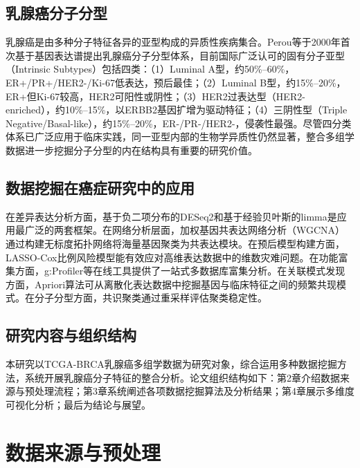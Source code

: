 \documentclass[12pt,a4paper]{ctexart}
\begin{document}
\subsection{乳腺癌分子分型}

乳腺癌是由多种分子特征各异的亚型构成的异质性疾病集合。Perou等\cite{perou2000molecular}于2000年首次基于基因表达谱提出乳腺癌分子分型体系，目前国际广泛认可的固有分子亚型（Intrinsic Subtypes）包括四类：（1）Luminal A型，约50\%--60\%，ER+/PR+/HER2-/Ki-67低表达，预后最佳；（2）Luminal B型，约15\%--20\%，ER+但Ki-67较高，HER2可阳性或阴性；（3）HER2过表达型（HER2-enriched），约10\%--15\%，以ERBB2基因扩增为驱动特征；（4）三阴性型（Triple Negative/Basal-like），约15\%--20\%，ER-/PR-/HER2-，侵袭性最强。尽管四分类体系已广泛应用于临床实践，同一亚型内部的生物学异质性仍然显著，整合多组学数据进一步挖掘分子分型的内在结构具有重要的研究价值。

\subsection{数据挖掘在癌症研究中的应用}

在差异表达分析方面，基于负二项分布的DESeq2\cite{love2014moderated}和基于经验贝叶斯的limma是应用最广泛的两套框架。在网络分析层面，加权基因共表达网络分析（WGCNA）\cite{langfelder2008wgcna}通过构建无标度拓扑网络将海量基因聚类为共表达模块。在预后模型构建方面，LASSO-Cox比例风险模型\cite{simon2011regularization}能有效应对高维表达数据中的维数灾难问题。在功能富集方面，g:Profiler\cite{kolberg2023gprofiler}等在线工具提供了一站式多数据库富集分析。在关联模式发现方面，Apriori算法\cite{agrawal1994fast}可从离散化表达数据中挖掘基因与临床特征之间的频繁共现模式。在分子分型方面，共识聚类\cite{wilkerson2010consensus}通过重采样评估聚类稳定性。

\subsection{研究内容与组织结构}

本研究以TCGA-BRCA乳腺癌多组学数据为研究对象，综合运用多种数据挖掘方法，系统开展乳腺癌分子特征的整合分析。论文组织结构如下：第2章介绍数据来源与预处理流程；第3章系统阐述各项数据挖掘算法及分析结果；第4章展示多维度可视化分析；最后为结论与展望。

\section{数据来源与预处理}
\end{document}
